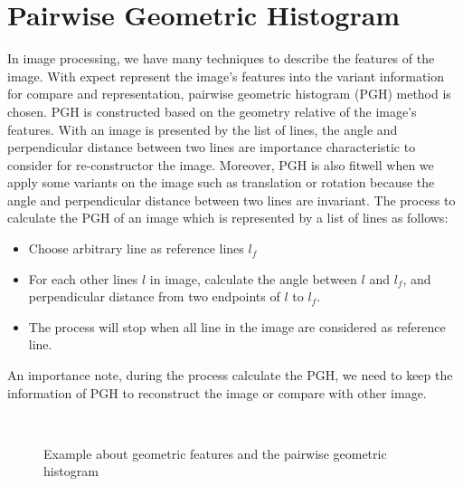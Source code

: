 \section{Pairwise Geometric Histogram}
In image processing, we have many techniques to describe the features of the image. With expect represent the image's features into the variant information for compare and representation, pairwise geometric histogram (PGH) method is chosen. PGH is constructed based on the geometry relative of the image's features. With an image is presented by the list of lines, the angle and perpendicular distance between two lines are importance characteristic to consider for re-constructor the image. Moreover, PGH is also fitwell when we apply some variants on the image such as translation or rotation because the angle and perpendicular distance between two lines are invariant. The process to calculate the PGH of an image which is represented by a list of lines as follows:
\begin{itemize}
	\item Choose arbitrary line as reference lines \textbf{$l_f$}
	\item For each other lines \textbf{$l$} in image, calculate the angle between \textbf{$l$} and \textbf{$l_f$}, and perpendicular distance from two endpoints of \textbf{$l$} to \textbf{$l_f$}.
	\item The process will stop when all line in the image are considered as reference line.
\end{itemize}
An importance note, during the process calculate the PGH, we need to keep the information of PGH to reconstruct the image or compare with other image.
\begin{figure}[h!]
\centering
{}~~
\caption{Example about geometric features and the pairwise geometric histogram}
\label{fig:figure_23}
\end{figure}~\\[0.2cm]
